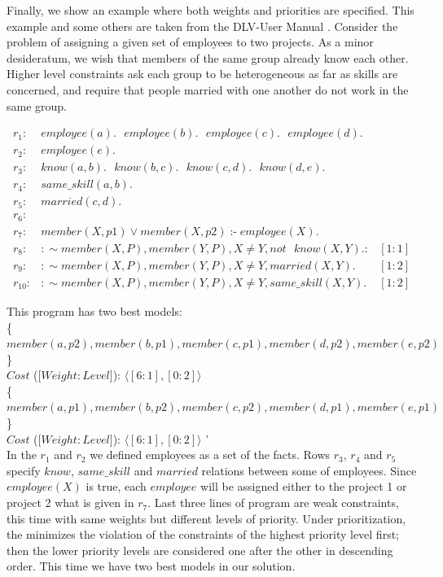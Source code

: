\documentclass[14pt,a4paper, titlepage]{article}
\DeclareMathOperator{\leftimpl}{:-}
\begin{document}
Finally, we show an example where both weights and priorities are specified. This example and some others are taken from the DLV-User Manual \cite{dlvum}. Consider the problem of assigning a given set of employees to two projects. As a minor desideratum, we wish that members of the same group already know each other. Higher level constraints ask each group to be heterogeneous as far as skills are concerned, and require that people married with one another do not work in the same group.
\begin{exmp}
\begin{align*}
r_1\colon& \mathit{employee}(a). \text{ } \mathit{employee}(b). \text{ }  \mathit{employee}(c). \text{ } \mathit{employee(d)}. \\
r_2\colon& \mathit{employee}(e). \\
r_3\colon& \mathit{know}(a,b). \text{ } \mathit{know}(b,c). \text{ } \mathit{know}(c,d). \text{ } \mathit{know}(d,e). \\
r_4\colon& \mathit{same\_skill}(a,b). \\
r_5\colon& \mathit{married(c,d)}. \\
r_6\colon&  \\ 
r_7\colon& \mathit{member}(X,p1) \vee \mathit{member}(X,p2) \leftimpl \mathit{employee}(X).\\
r_8\colon& : \sim \mathit{member}(X,P), \mathit{member}(Y,P), X \neq Y, \mathit{not} \text{ } \mathit{know(X,Y)}. \colon& [1:1] \\
r_{9}\colon& : \sim  \mathit{member}(X,P), \mathit{member}(Y,P), X \neq Y, \mathit{marrie}d(X,Y). & [1:2]\\
r_{10}\colon& : \sim member(X,P), member(Y,P), X \neq Y, same\_skill(X,Y). & [1:2] 
\end{align*}
\end{exmp}
This program has two best models:
\\ \{$\mathit{member}(a,p2), \mathit{member}(b,p1), \mathit{member}(c,p1), \mathit{member}(d,p2), \mathit{member}(e,p2)$\}
\\$\mathit{Cost}$ ($[ \mathit{Weight:Level]}$): $ \langle [6:1],[0:2] \rangle $
\\ \{$\mathit{member}(a,p1), \mathit{member}(b,p2), \mathit{member}(c,p2), \mathit{member}(d,p1), \mathit{member}(e,p1)$\}
\\$\mathit{Cost}$ ($[ \mathit{Weight:Level]}$): $ \langle [6:1],[0:2] \rangle $ '\\

In the $r_1$ and $r_2$ we defined employees as a set of the facts. Rows $r_3$, $r_4$ and $r_5$ specify $\mathit{know}$, $\mathit{same\_skill}$ and $\mathit{married}$ relations between some of employees. Since $\mathit{employee}(X)$ is true, each $\mathit{employee}$ will be assigned either to the project 1 or project 2 what is given in $r_7$. Last three lines of program are weak constraints, this time with same weights but different levels of priority. Under prioritization, the \dlvhex{} minimizes the violation of the constraints of the highest priority level first; then the lower priority levels are considered one after the other in descending order. This time we have two best models in our solution.     
\end{document}
